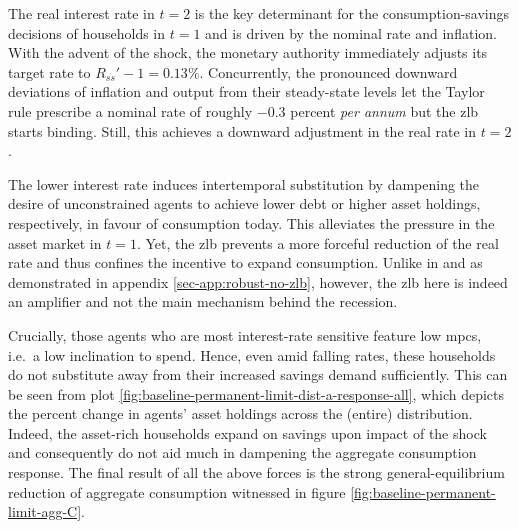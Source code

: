 \documentclass[a4paper,12pt]{article} %
\numberwithin{equation}{section} %
\numberwithin{figure}{section}
\numberwithin{table}{section}
\begin{document}
The real interest rate in $t=2$ is the key determinant for the consumption-savings decisions of households in $t=1$ and is driven by the nominal rate and inflation. With the advent of the shock, the monetary authority immediately adjusts its target rate to $R_{ss}' - 1 = 0.13\%$. Concurrently, the pronounced downward deviations of inflation and output from their steady-state levels let the Taylor rule prescribe a nominal rate of roughly $-0.3$ percent \textit{per annum} but the \Gls{zlb} starts binding. Still, this achieves a downward adjustment in the real rate in $t=2$. 

The lower interest rate induces intertemporal substitution by dampening the desire of unconstrained agents to achieve lower debt or higher asset holdings, respectively, in favour of consumption today. This alleviates the pressure in the asset market in $t=1$. Yet, the \Gls{zlb} prevents a more forceful reduction of the real rate and thus confines the incentive to expand consumption. Unlike in \textcite{egg2012} and as demonstrated in appendix \ref{sec-app:robust-no-zlb}, however, the \Gls{zlb} here is indeed an amplifier and not the main mechanism behind the recession. 

Crucially, those agents who are most interest-rate sensitive feature low \Gls{mpc}s, i.e.~a low inclination to spend. Hence, even amid falling rates, these households do not substitute away from their increased savings demand sufficiently. This can be seen from plot \ref{fig:baseline-permanent-limit-dist-a-response-all}, which depicts the percent change in agents' asset holdings across the (entire) distribution. Indeed, the asset-rich households expand on savings upon impact of the shock and consequently do not aid much in dampening the aggregate consumption response. The final result of all the above forces is the strong general-equilibrium reduction of aggregate consumption witnessed in figure \ref{fig:baseline-permanent-limit-agg-C}.
\end{document}
